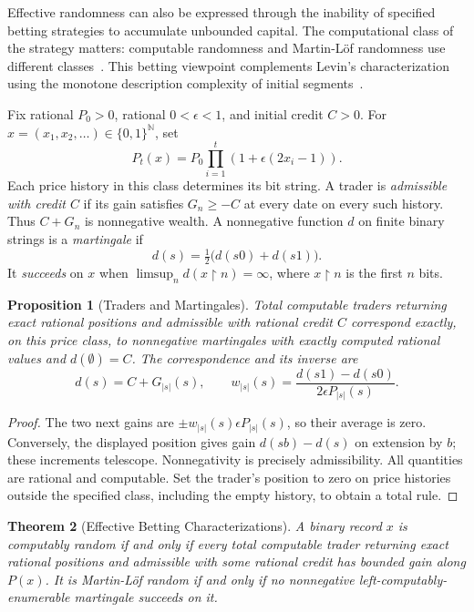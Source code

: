 \documentclass[aps,pra,reprint,superscriptaddress,amsmath,amssymb,floatfix]{revtex4-2}
\theoremstyle{plain}
\newtheorem{theorem}{Theorem}
\newtheorem{proposition}[theorem]{Proposition}
\theoremstyle{definition}
\theoremstyle{remark}
\begin{document}
Effective randomness can also be expressed through the inability of specified
betting strategies to accumulate unbounded capital. The computational class
of the strategy matters: computable randomness and Martin-L\"of randomness
use different classes~\cite{Schnorr1971,DH,Nies2009}.
This betting viewpoint complements Levin's characterization using the
monotone description complexity of initial segments~\cite{levin-73}.

Fix rational \(P_0>0\), rational \(0<\epsilon<1\), and initial credit \(C>0\).
For \(x=(x_1,x_2,\ldots)\in\{0,1\}^{\mathbb N}\), set
\[
  P_t(x)=P_0\prod_{i=1}^{t}(1+\epsilon(2x_i-1)).
\]
Each price history in this class determines its bit string.
A trader is \emph{admissible with credit \(C\)} if its gain satisfies
\(G_n\ge-C\) at every date on every such history.
Thus \(C+G_n\) is nonnegative wealth. A nonnegative function \(d\) on finite
binary strings is a \emph{martingale} if
\[
  d(s)=\tfrac12\bigl(d(s0)+d(s1)\bigr).
\]
It \emph{succeeds} on \(x\) when
\(\limsup_n d(x\upharpoonright n)=\infty\), where
\(x\upharpoonright n\) is the first \(n\) bits.

\begin{proposition}[Traders and Martingales]
\label{prop:trader-martingale}
Total computable traders returning exact rational positions and admissible with rational credit
\(C\) correspond exactly, on this price class, to nonnegative martingales
with exactly computed rational values and \(d(\emptyset)=C\).
The correspondence and its inverse are
\[
  d(s)=C+G_{|s|}(s),\qquad
  w_{|s|}(s)=\frac{d(s1)-d(s0)}{2\epsilon P_{|s|}(s)}.
\]
\end{proposition}

\begin{proof}
The two next gains are \(\pm w_{|s|}(s)\epsilon P_{|s|}(s)\), so their
average is zero. Conversely, the displayed position gives gain
\(d(sb)-d(s)\) on extension by \(b\); these increments telescope.
Nonnegativity is precisely admissibility. All quantities are rational and
computable. Set the trader's position to zero on price histories outside
the specified class, including the empty history, to obtain a total rule.
\end{proof}

\begin{theorem}[Effective Betting Characterizations]
\label{thm:ville}
A binary record \(x\) is computably random if and only if every total
computable trader returning exact rational positions and admissible with some rational credit
has bounded gain along \(P(x)\).
It is Martin-L\"of random if and only if no nonnegative
left-computably-enumerable martingale succeeds on it.
\end{theorem}
\end{document}
